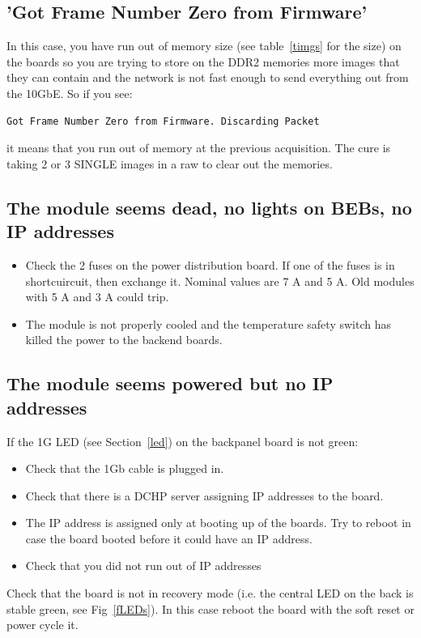 \documentclass{article}
\begin{document}
{{{\subsection{'Got Frame Number Zero from Firmware'}\label{outmemory}
In this case, you have run out of memory size (see table~\ref{timgs} for the size) on the boards so you are trying to store on the DDR2 memories more images that they can contain and the network is not fast enough to send everything out from the 10GbE.
So if you see:
\begin{verbatim}
Got Frame Number Zero from Firmware. Discarding Packet
\end{verbatim}
it means that you run out of memory at the previous acquisition. The  cure is taking 2 or 3 SINGLE images in a raw to clear out the memories.
 


\subsection{The module seems dead, no lights on BEBs, no IP addresses}
\begin{itemize}
\item Check the 2 fuses on the power distribution board. If one of the fuses is in shortcuircuit, then exchange it. Nominal values are 7 A and 5 A. Old modules with 5 A and 3 A could trip.
\item The module is not properly cooled and the temperature safety switch has killed the power to the backend boards. 
\end{itemize}

\subsection{The module seems powered but no IP addresses}
If the 1G LED (see Section~\ref{led}) on the backpanel board is not green:
\begin{itemize}
\item Check that the 1Gb cable is plugged in.
\item Check that there is a DCHP server assigning IP addresses to the board.
\item The IP address is assigned only at booting up of the boards. Try to reboot in case the board booted before it could have an IP address. 
\item Check that you did not run out of IP addresses 
\end{itemize}
 Check that the board is not in recovery mode (i.e. the central LED on the back is stable green, see Fig~\ref{fLEDs}). In this case reboot the board with the soft reset or power cycle it.

}}}
\end{document}
